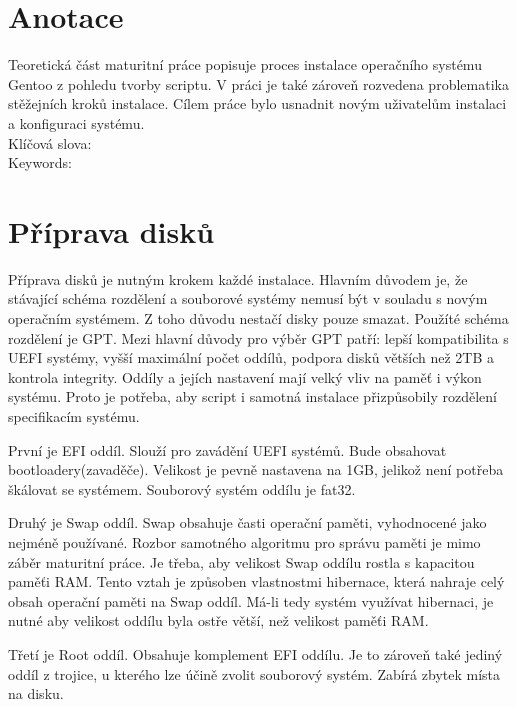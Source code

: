 \documentclass[12pt,a4paper,twoside,]{article}
\begin{document}
\newpage
\renewcommand{\contentsname}{\textsf{Obsah}}\tableofcontents

\newpage
\section{\textsf{Anotace}}
{Teoretická část maturitní práce popisuje proces instalace operačního systému Gentoo
	z pohledu tvorby scriptu. V práci je také zároveň rozvedena problematika stěžejních
	kroků instalace. Cílem práce bylo usnadnit novým uživatelům instalaci a konfiguraci
	systému.
	\vspace{2cm}
	\\Klíčová slova:
	\\Keywords:
}


\newpage

\section{\textsf{Příprava disků}}
{Příprava disků je nutným krokem každé instalace. Hlavním důvodem je, 
že stávající schéma rozdělení a souborové systémy nemusí být v souladu s novým operačním systémem. 
Z toho důvodu nestačí disky pouze smazat. Použíté schéma rozdělení je GPT. 
Mezi hlavní důvody pro výběr GPT patří: lepší kompatibilita s UEFI systémy, 
vyšší maximální počet oddílů, podpora disků větších než 2TB a kontrola integrity.
Oddíly a jejích nastavení mají velký vliv na paměť i výkon systému. Proto je potřeba, 
aby script i samotná instalace přizpůsobily rozdělení specifikacím systému.} 

{\hspace*{-1.5em}První je EFI oddíl. Slouží pro zavádění UEFI systémů. Bude obsahovat bootloadery(zavaděče). 
Velikost je pevně nastavena na 1GB, jelikož není potřeba škálovat se systémem.
Souborový systém oddílu je fat32.}

{\hspace*{-1.5em}Druhý je Swap oddíl. Swap obsahuje časti operační paměti, vyhodnocené jako nejméně používané. 
Rozbor samotného algoritmu pro správu paměti je mimo záběr maturitní práce. Je třeba,
aby velikost Swap oddílu rostla s kapacitou paměťi RAM. Tento vztah je způsoben vlastnostmi hibernace, 
která nahraje celý obsah operační paměti na Swap oddíl. Má-li tedy systém využívat hibernaci, je nutné
aby velikost oddílu byla ostře větší, než velikost paměťi RAM. }

{\hspace*{-1.5em}Třetí je Root oddíl. Obsahuje komplement EFI oddílu. Je to zároveň také jediný oddíl z trojice, 
u kterého lze účině zvolit souborový systém. Zabírá zbytek místa na disku.}
\end{document}
